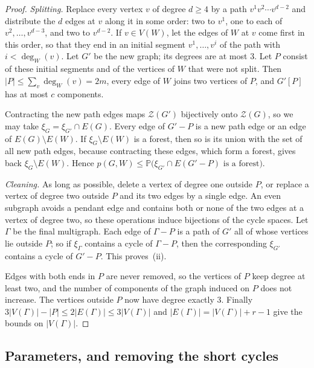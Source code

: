 \documentclass[11pt]{article}
\theoremstyle{definition}
\theoremstyle{remark}
\newcommand{\Z}{\mathcal{Z}}
\newcommand{\PP}{\mathbb{P}}
\newcommand{\sm}{\setminus}
\begin{document}
\begin{proof}
\emph{Splitting.} Replace every vertex $v$ of degree $d\ge4$ by a path $v^{1}v^{2}\cdots v^{d-2}$
and distribute the $d$ edges at $v$ along it in some order: two to $v^{1}$, one to each of
$v^{2},\dots,v^{d-3}$, and two to $v^{d-2}$. If $v\in V(W)$, let the edges of $W$ at $v$ come first
in this order, so that they end in an initial segment $v^{1},\dots,v^{i}$ of the path with
$i<\deg_W(v)$. Let $G'$ be the new graph; its degrees are at most $3$. Let $P$ consist of these
initial segments and of the vertices of $W$ that were not split. Then $|P|\le\sum_v\deg_W(v)=2m$,
every edge of $W$ joins two vertices of $P$, and $G'[P]$ has at most $c$ components.

Contracting the new path edges maps $\Z(G')$ bijectively onto $\Z(G)$, so we may take
$\xi_G=\xi_{G'}\cap E(G)$. Every edge of $G'-P$ is a new path edge or an edge of $E(G)\sm E(W)$. If
$\xi_G\sm E(W)$ is a forest, then so is its union with the set of all new path edges, because
contracting these edges, which form a forest, gives back $\xi_G\sm E(W)$. Hence
$p(G,W)\le\PP\bigl(\xi_{G'}\cap E(G'-P)\text{ is a forest}\bigr)$.

\emph{Cleaning.} As long as possible, delete a vertex of degree one outside $P$, or replace a vertex
of degree two outside $P$ and its two edges by a single edge. An even subgraph avoids a pendant edge
and contains both or none of the two edges at a vertex of degree two, so these operations induce
bijections of the cycle spaces. Let $\Gamma$ be the final multigraph. Each edge of $\Gamma-P$ is a
path of $G'$ all of whose vertices lie outside $P$; so if $\xi_\Gamma$ contains a cycle of
$\Gamma-P$, then the corresponding $\xi_{G'}$ contains a cycle of $G'-P$. This proves~(ii).

Edges with both ends in $P$ are never removed, so the vertices of $P$ keep degree at least two, and
the number of components of the graph induced on $P$ does not increase. The vertices outside $P$ now
have degree exactly $3$. Finally $3|V(\Gamma)|-|P|\le2|E(\Gamma)|\le3|V(\Gamma)|$ and
$|E(\Gamma)|=|V(\Gamma)|+r-1$ give the bounds on $|V(\Gamma)|$.
\end{proof}

\subsection{Parameters, and removing the short cycles}
\end{document}
